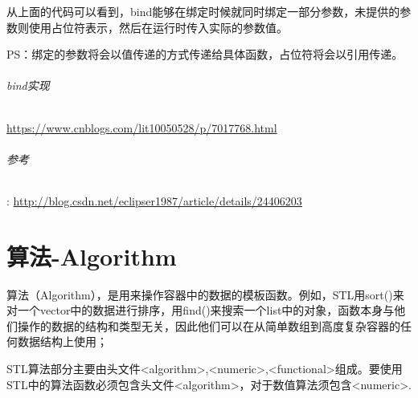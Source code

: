 \documentclass[UTF8,a4paper,12pt]{ctexbook}
\begin{document}
		从上面的代码可以看到，bind能够在绑定时候就同时绑定一部分参数，未提供的参数则使用占位符表示，然后在运行时传入实际的参数值。
		
		PS：绑定的参数将会以值传递的方式传递给具体函数，占位符将会以引用传递。
		
		\subparagraph{bind实现}
			\url{https://www.cnblogs.com/lit10050528/p/7017768.html}
		
		\subparagraph{参考}:
			\url{http://blog.csdn.net/eclipser1987/article/details/24406203}

\chapter{算法-Algorithm}
	算法（Algorithm），是用来操作容器中的数据的模板函数。例如，STL用sort()来对一个vector中的数据进行排序，用find()来搜索一个list中的对象，函数本身与他们操作的数据的结构和类型无关，因此他们可以在从简单数组到高度复杂容器的任何数据结构上使用；
	
	STL算法部分主要由头文件<algorithm>,<numeric>,<functional>组成。要使用STL中的算法函数必须包含头文件<algorithm>，对于数值算法须包含<numeric>.
\end{document}
